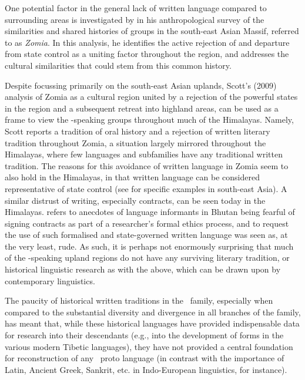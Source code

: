 One potential factor in the general lack of written language compared to surrounding areas is investigated by  in his anthropological survey of the similarities and shared histories of groups in the south-east Asian Massif, referred to as \textit{Zomia}. In this analysis, he identifies the active rejection of and departure from state control as a uniting factor throughout the region, and addresses the cultural similarities that could stem from this common history.

Despite focussing primarily on the south-east Asian uplands, Scott's (2009) analysis of Zomia as a cultural region united by a rejection of the powerful states in the region and a subsequent retreat into highland areas, can be used as a frame to view the \lfam-speaking groups throughout much of the Himalayas. Namely, Scott reports a tradition of oral history and a rejection of written literary tradition throughout Zomia, a situation largely mirrored throughout the Himalayas, where few languages and subfamilies have any traditional written tradition. The reasons for this avoidance of written language in Zomia seem to also hold in the Himalayas, in that written language can be considered representative of state control (see  for specific examples in south-east Asia). A similar distrust of writing, especially contracts, can be seen today in the Himalayas.  refers to anecdotes of language informants in Bhutan being fearful of signing contracts as part of a researcher's formal ethics process, and to request the use of such formalised and state-governed written language was seen as, at the very least, rude.  As such, it is perhaps not enormously surprising that much of the \lfam-speaking upland regions do not have any surviving literary tradition, or historical linguistic research as with the above, which can be drawn upon by contemporary linguistics.

The paucity of historical written traditions in the \lfam\ family, especially when compared to the substantial diversity and divergence in all branches of the family, has meant that, while these historical languages have provided indispensable data for research into their descendants (e.g., into the development of forms in the various modern Tibetic languages), they have not provided a central foundation for reconstruction of any \lfam\ proto language \cite{STEDT} (in contrast with the importance of Latin, Ancient Greek, Sankrit, etc. in Indo-European linguistics, for instance).

